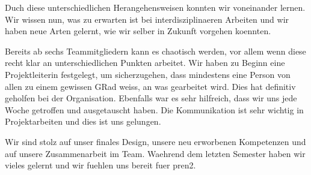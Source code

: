 Duch diese unterschiedlichen Herangehensweisen konnten wir voneinander lernen. Wir wissen nun, was zu erwarten ist bei interdisziplinaeren Arbeiten und wir haben neue Arten gelernt, wie wir selber  in Zukunft vorgehen koennten.

Bereits ab sechs Teammitgliedern kann es chaotisch werden, vor allem wenn diese recht klar an unterschiedlichen Punkten arbeitet. Wir haben zu Beginn eine Projektleiterin festgelegt, um sicherzugehen, dass mindestens eine Person von allen zu einem gewissen GRad weiss, an was gearbeitet wird. Dies hat definitiv geholfen bei der Organisation. Ebenfalls war es sehr hilfreich, dass wir uns jede Woche getroffen und ausgetauscht haben. Die Kommunikation ist sehr wichtig in Projektarbeiten und dies ist uns gelungen.

Wir sind stolz auf unser finales Design, unsere neu erworbenen Kompetenzen und auf unsere Zusammenarbeit im Team. Waehrend dem letzten Semester haben wir vieles gelernt und wir fuehlen uns bereit fuer \acrshort{pren2}.




